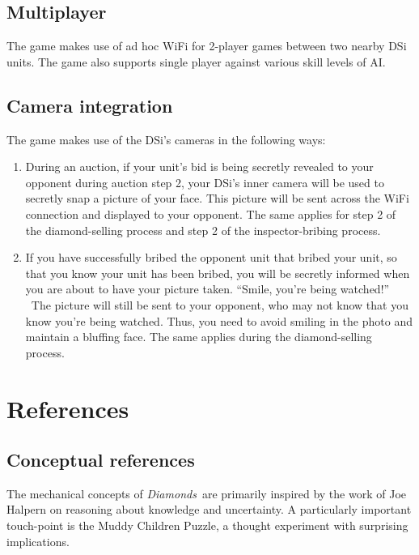 \documentclass[12pt]{article}
\newcommand{\gtitle}{{\it Diamonds}}
\begin{document}
\subsection{Multiplayer}

The game makes use of ad hoc WiFi for 2-player games between two nearby DSi units.  The game also supports single player against various skill levels of AI.

\subsection{Camera integration}
The game makes use of the DSi's cameras in the following ways:
\begin{enumerate}

\item During an auction, if your unit's bid is being secretly revealed to your opponent during auction step 2, your DSi's inner camera will be used to secretly snap a picture of your face.  This picture will be sent across the WiFi connection and displayed to your opponent.  The same applies for step 2 of the diamond-selling process and step 2 of the inspector-bribing process.

\item If you have successfully bribed the opponent unit that bribed your unit, so that you know your unit has been bribed, you will be secretly informed when you are about to have your picture taken.  ``Smile, you're being watched!'' \  The picture will still be sent to your opponent, who may not know that you know you're being watched.  Thus, you need to avoid smiling in the photo and maintain a bluffing face.  The same applies during the diamond-selling process.

\end{enumerate}

\section{References}

\subsection{Conceptual references}
The mechanical concepts of \gtitle\ are primarily inspired by the work of Joe Halpern on reasoning about knowledge and uncertainty.  A particularly important touch-point is the Muddy Children Puzzle, a thought experiment with surprising implications.
\end{document}
